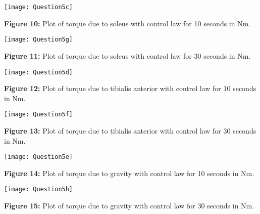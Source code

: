 \documentclass{article}
\begin{document}
\noindent
\texttt{[image: Question5c]}
\begin{center}\textbf{Figure 10:} Plot of torque due to soleus with control law for 10 seconds in Nm.\end{center}

\noindent
\texttt{[image: Question5g]}
\begin{center}\textbf{Figure 11:} Plot of torque due to soleus with control law for 30 seconds in Nm.\end{center}

\noindent
\texttt{[image: Question5d]}
\begin{center}\textbf{Figure 12:} Plot of torque due to tibialis anterior with control law for 10 seconds in Nm.\end{center}

\noindent
\texttt{[image: Question5f]}
\begin{center}\textbf{Figure 13:} Plot of torque due to tibialis anterior with control law for 30 seconds in Nm.\end{center}

\noindent
\texttt{[image: Question5e]}
\begin{center}\textbf{Figure 14:} Plot of torque due to gravity with control law for 10 seconds in Nm.\end{center}

\noindent
\texttt{[image: Question5h]}
\begin{center}\textbf{Figure 15:} Plot of torque due to gravity with control law for 30 seconds in Nm.\end{center}
\end{document}
